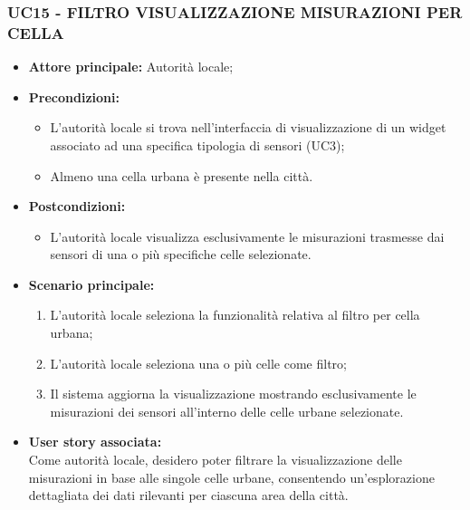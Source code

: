 \subsubsection{UC15 - FILTRO VISUALIZZAZIONE MISURAZIONI PER CELLA}
\begin{itemize}
    \item \textbf{Attore principale:} Autorità locale;
    \item \textbf{Precondizioni:}
        \begin{itemize}
            \item L'autorità locale si trova nell'interfaccia di visualizzazione di un widget associato ad una specifica tipologia di sensori (UC3);
            \item Almeno una cella urbana è presente nella città. 
        \end{itemize}
    \item \textbf{Postcondizioni:}
          \begin{itemize}
              \item L'autorità locale visualizza esclusivamente le misurazioni trasmesse dai sensori di una o più specifiche celle selezionate.
          \end{itemize}
    \item \textbf{Scenario principale:}
          \begin{enumerate}
              \item L'autorità locale seleziona la funzionalità relativa al filtro per cella urbana;
              \item L'autorità locale seleziona una o più celle come filtro;
              \item Il sistema aggiorna la visualizzazione mostrando esclusivamente le misurazioni dei sensori all'interno delle celle urbane selezionate.
          \end{enumerate}
    \item \textbf{User story associata:} \\
        Come autorità locale, desidero poter filtrare la visualizzazione delle misurazioni in base alle singole celle urbane, consentendo un'esplorazione dettagliata dei dati rilevanti per ciascuna area della città.
\end{itemize}
